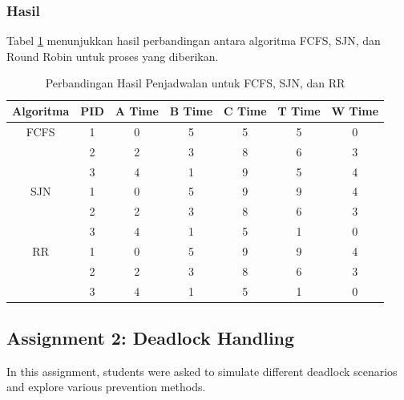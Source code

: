 \documentclass[12pt]{article}
\begin{document}
\subsubsection{Hasil}
Tabel \ref{tab:hasil_perbandingan} menunjukkan hasil perbandingan antara algoritma FCFS, SJN, dan Round Robin untuk proses yang diberikan.

\begin{table}[htbp]
    \centering
    \begin{tabular}{|c|c|c|c|c|c|c|}
        \hline
        Algoritma & PID & A Time & B Time & C Time & T Time & W Time \\
        \hline
        FCFS      & 1   & 0            & 5          & 5               & 5               & 0            \\
                  & 2   & 2            & 3          & 8               & 6               & 3            \\
                  & 3   & 4            & 1          & 9               & 5               & 4            \\
        \hline
        SJN       & 1   & 0            & 5          & 9               & 9               & 4            \\
                  & 2   & 2            & 3          & 8               & 6               & 3            \\
                  & 3   & 4            & 1          & 5               & 1               & 0            \\
        \hline
        RR        & 1   & 0            & 5          & 9               & 9               & 4            \\
                  & 2   & 2            & 3          & 8               & 6               & 3            \\
                  & 3   & 4            & 1          & 5               & 1               & 0            \\
        \hline
    \end{tabular}
    \caption{Perbandingan Hasil Penjadwalan untuk FCFS, SJN, dan RR}
    \label{tab:hasil_perbandingan}
\end{table}

\subsection{Assignment 2: Deadlock Handling}
In this assignment, students were asked to simulate different deadlock scenarios and explore various prevention methods.
\end{document}
